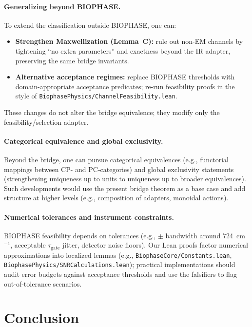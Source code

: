 \documentclass[12pt,a4paper]{article}
\begin{document}
\paragraph{Generalizing beyond BIOPHASE.}
To extend the classification outside BIOPHASE, one can:
\begin{itemize}
  \item \textbf{Strengthen Maxwellization (Lemma~C):} rule out non-EM channels by tightening ``no extra parameters'' and exactness beyond the IR adapter, preserving the same bridge invariants.
  \item \textbf{Alternative acceptance regimes:} replace BIOPHASE thresholds with domain-appropriate acceptance predicates; re-run feasibility proofs in the style of \texttt{BiophasePhysics/ChannelFeasibility.lean}.
\end{itemize}
These changes do not alter the bridge equivalence; they modify only the feasibility/selection adapter.

\paragraph{Categorical equivalence and global exclusivity.}
Beyond the bridge, one can pursue categorical equivalences (e.g., functorial mappings between CP- and PC-categories) and global exclusivity statements (strengthening uniqueness up to units to uniqueness up to broader equivalences). Such developments would use the present bridge theorem as a base case and add structure at higher levels (e.g., composition of adapters, monoidal actions).

\paragraph{Numerical tolerances and instrument constraints.}
BIOPHASE feasibility depends on tolerances (e.g., \(\pm\) bandwidth around 724~cm\(^{-1}\), acceptable \(\tau_{\mathrm{gate}}\) jitter, detector noise floors). Our Lean proofs factor numerical approximations into localized lemmas (e.g., \texttt{BiophaseCore/Constants.lean}, \texttt{BiophasePhysics/SNRCalculations.lean}); practical implementations should audit error budgets against acceptance thresholds and use the falsifiers to flag out-of-tolerance scenarios.

\section{Conclusion}
\label{sec:conclusion}
\end{document}
